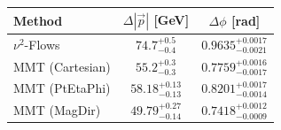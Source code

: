     \begin{tabular}{lcc}
        \toprule
        Method & $\Delta |\vec p|$ [GeV] & $\Delta \phi$ [rad] \\
        \midrule
        $\nu^2$-Flows & $74.7^{+0.5}_{-0.4}$ & $0.9635^{+0.0017}_{-0.0021}$ \\
        MMT (Cartesian) & $55.2^{+0.3}_{-0.3}$ & $0.7759^{+0.0016}_{-0.0017}$ \\
        MMT (PtEtaPhi) & $58.18^{+0.13}_{-0.13}$ & $0.8201^{+0.0017}_{-0.0014}$ \\
        MMT (MagDir) & $49.79^{+0.27}_{-0.14}$ & $0.7418^{+0.0012}_{-0.0009}$ \\
        \bottomrule
    \end{tabular}